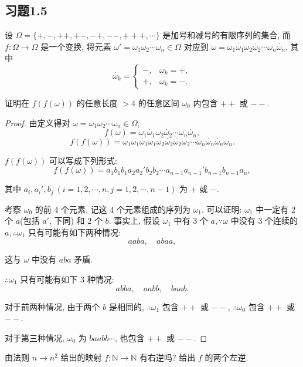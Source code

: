 \documentclass{ctexart}
\begin{document}
\subsection{习题1.5}
\setcounter{exsection}{5}
\begin{exercise}%
    设 $\Omega=\{+,-,++,+-,-+,--,+++,\cdots\}$ 是加号和减号的有限序列的集合, 而 $f:\Omega\to\Omega$ 是一个变换, 将元素 $\omega'=\omega_1\omega_2\cdots\omega_n\in\Omega$ 对应到 $\omega=\omega_1\dot{\omega_1}\omega_2\dot{\omega_2}\cdots\omega_n\dot{\omega_n}$, 其中
    \[\dot{\omega_k}=\begin{cases}
        -, & \omega_k=+, \\
        +, & \omega_k=-.
    \end{cases}\]
    
    证明在 $f(f(\omega))$ 的任意长度 $>4$ 的任意区间 $\omega_0$ 内包含 $++$ 或 $--$.    
\end{exercise}
\begin{proof}
    由定义得对 $\omega=\omega_1\omega_2\cdots\omega_n\in\Omega$,
    \[f(\omega)=\omega_1\dot{\omega_1}\omega_2\dot{\omega_2}\cdots\omega_n\dot{\omega_n},\]
    \[f(f(\omega))=\omega_1\dot{\omega_1}\dot{\omega_1}\omega_1\omega_2\dot{\omega_2}\dot{\omega_2}\omega_2\cdots\omega_n\dot{\omega_n}\dot{\omega_n}\omega_n.\]

    $f(f(\omega))$ 可以写成下列形式:
    \[f(f(\omega))=a_1b_1b_1a_2a_2'b_2b_2\cdots a_{n-1}a_{n-1}'b_{n-1}b_{n-1}a_n,\]

    其中 $a_i,a_i',b_j\ (i=1,2,\cdots,n,j=1,2,\cdots,n-1)$ 为 $+$ 或 $-$.

    考察 $\omega_0$ 的前 $4$ 个元素, 记这 $4$ 个元素组成的序列为 $\omega_1$. 可以证明: $\omega_1$ 中一定有 $2$ 个 $a$(包括 $a'$, 下同) 和 $2$ 个 $b$. 事实上, 假设 $\omega_1$ 中有 $3$ 个 $a,\because \omega$ 中没有 $3$ 个连续的 $a,\therefore \omega_1$ 只有可能有如下两种情况:
    \[aaba,\quad abaa,\]

    这与 $\omega$ 中没有 $aba$ 矛盾.

    $\therefore \omega_1$ 只有可能有如下 $3$ 种情况:
    \[abba,\quad aabb,\quad baab.\]

    对于前两种情况, 由于两个 $b$ 是相同的, $\therefore \omega_1$ 包含 $++$ 或 $--$, $\therefore \omega_0$ 包含 $++$ 或 $--$.

    对于第三种情况, $\omega_0$ 为 $baabb\cdots$, 也包含 $++$ 或 $--$.
\end{proof}
\begin{exercise}%
    由法则 $n\to n^2$ 给出的映射 $f:\mathbb{N}\to\mathbb{N}$ 有右逆吗? 给出 $f$ 的两个左逆.
\end{exercise}
\end{document}
